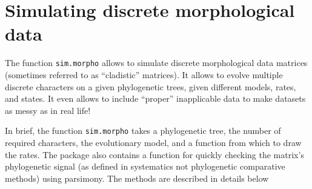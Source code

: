 \documentclass[]{book}
\newenvironment{Shaded}{\begin{snugshade}}{\end{snugshade}}
\newcommand{\CommentTok}[1]{\textcolor[rgb]{0.56,0.35,0.01}{\textit{#1}}}
\newcommand{\DataTypeTok}[1]{\textcolor[rgb]{0.13,0.29,0.53}{#1}}
\newcommand{\DecValTok}[1]{\textcolor[rgb]{0.00,0.00,0.81}{#1}}
\newcommand{\FloatTok}[1]{\textcolor[rgb]{0.00,0.00,0.81}{#1}}
\newcommand{\KeywordTok}[1]{\textcolor[rgb]{0.13,0.29,0.53}{\textbf{#1}}}
\newcommand{\NormalTok}[1]{#1}
\newcommand{\OperatorTok}[1]{\textcolor[rgb]{0.81,0.36,0.00}{\textbf{#1}}}
\newcommand{\OtherTok}[1]{\textcolor[rgb]{0.56,0.35,0.01}{#1}}
\newcommand{\StringTok}[1]{\textcolor[rgb]{0.31,0.60,0.02}{#1}}
\begin{document}
\hypertarget{simulating-discrete-morphological-data}{%
\section{Simulating discrete morphological data}\label{simulating-discrete-morphological-data}}

The function \texttt{sim.morpho} allows to simulate discrete morphological data matrices (sometimes referred to as ``cladistic'' matrices).
It allows to evolve multiple discrete characters on a given phylogenetic trees, given different models, rates, and states.
It even allows to include ``proper'' inapplicable data to make datasets as messy as in real life!

In brief, the function \texttt{sim.morpho} takes a phylogenetic tree, the number of required characters, the evolutionary model, and a function from which to draw the rates.
The package also contains a function for quickly checking the matrix's phylogenetic signal (as defined in systematics not phylogenetic comparative methods) using parsimony.
The methods are described in details below

\begin{Shaded}
\end{Shaded}
\end{document}
